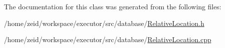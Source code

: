 The documentation for this class was generated from the following files:\begin{DoxyCompactItemize}
\item 
/home/zeid/workspace/executor/src/database/\hyperlink{_relative_location_8h}{RelativeLocation.h}\item 
/home/zeid/workspace/executor/src/database/\hyperlink{_relative_location_8cpp}{RelativeLocation.cpp}\end{DoxyCompactItemize}

